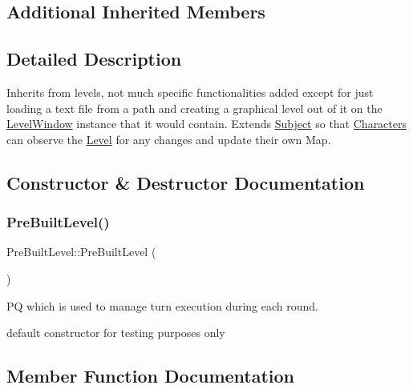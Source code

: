 \subsection*{Additional Inherited Members}


\subsection{Detailed Description}
Inherits from levels, not much specific functionalities added except for just loading a text file from a path and creating a graphical level out of it on the \hyperlink{class_level_window}{Level\+Window} instance that it would contain. Extends \hyperlink{class_subject}{Subject} so that \hyperlink{class_characters}{Characters} can observe the \hyperlink{class_level}{Level} for any changes and update their own Map. 

\subsection{Constructor \& Destructor Documentation}
\hypertarget{class_pre_built_level_a86e618ddeb7a0ca8484f268dc927819d}{}\label{class_pre_built_level_a86e618ddeb7a0ca8484f268dc927819d} 
\subsubsection{\texorpdfstring{Pre\+Built\+Level()}{PreBuiltLevel()}}
{\footnotesize\ttfamily Pre\+Built\+Level\+::\+Pre\+Built\+Level (\begin{DoxyParamCaption}{ }\end{DoxyParamCaption})}



PQ which is used to manage turn execution during each round. 

default constructor for testing purposes only 

\subsection{Member Function Documentation}
\hypertarget{class_pre_built_level_ac55f77e0ee464325cdd3ffa91292b0c8}{}\label{class_pre_built_level_ac55f77e0ee464325cdd3ffa91292b0c8} 

